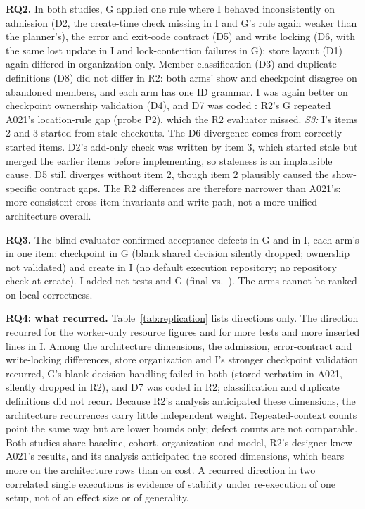 \documentclass[10pt,conference]{IEEEtran}
\newcommand{\G}{G}
\newcommand{\I}{I}
\begin{document}
\textbf{RQ2.} In both studies, \G{} applied one rule where \I{} behaved inconsistently on admission (D2, the create-time check missing in \I{} and \G's rule again weaker than the planner's), the error and exit-code contract (D5) and write locking (D6, with the same lost update in \I{} and lock-contention failures in \G); store layout (D1) again differed in organization only. Member classification (D3) and duplicate definitions (D8) did not differ in R2: both arms' show and checkpoint disagree on abandoned members, and each arm has one ID grammar. %
\I{} was again better on checkpoint ownership validation (D4), and D7 was coded \ArchDSevenRtwo: R2's \G{} repeated A021's location-rule gap (probe P2), which the R2 evaluator missed. %
\emph{S3:} \I's items 2 and 3 started from stale checkouts. The D6 divergence comes from correctly started items. D2's add-only check was written by item 3, which started stale but merged the earlier items before implementing, so staleness is an implausible cause. D5 still diverges without item 2, though item 2 plausibly caused the show-specific contract gaps. %
The R2 differences are therefore narrower than A021's: more consistent cross-item invariants and write path, not a more unified architecture overall.

\textbf{RQ3.} The blind evaluator confirmed \RtwoDefectsGrouped{} acceptance defects in \G{} and \RtwoDefectsIndep{} in \I{}, each arm's in one item: checkpoint in \G{} (blank shared decision silently dropped; ownership not validated) and create in \I{} (no default execution repository; no repository check at create). %
\I{} added \RtwoTestsAddedIndep{} net tests and \G{} \RtwoTestsAddedGrouped{} (final \RtwoTestsIndep{} vs.\ \RtwoTestsGrouped{}). The arms cannot be ranked on local correctness. %



\textbf{RQ4: what recurred.} Table~\ref{tab:replication} lists directions only. The direction recurred for the worker-only resource figures and for more tests and more inserted lines in \I. Among the architecture dimensions, the admission, error-contract and write-locking differences, store organization and \I's stronger checkpoint validation recurred, \G's blank-decision handling failed in both (stored verbatim in A021, silently dropped in R2), and D7 was coded \ArchDSevenRtwo{} in R2; classification and duplicate definitions did not recur. Because R2's analysis anticipated these dimensions, the architecture recurrences carry little independent weight. Repeated-context counts point the same way but are lower bounds only; defect counts are not comparable. %
Both studies share baseline, cohort, organization and model, R2's designer knew A021's results, and its analysis anticipated the scored dimensions, which bears more on the architecture rows than on cost. A recurred direction in two correlated single executions is evidence of stability under re-execution of one setup, not of an effect size or of generality. %
\end{document}
